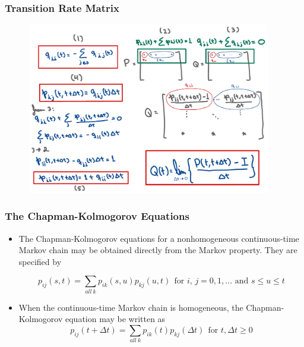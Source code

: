 \begin{frame}
    \frametitle{Transition Rate Matrix}
    \begin{figure}
        \centering
        \includegraphics[width=0.95\textwidth]{slides/figures/ctmc_qt_part_two.pdf}
    \end{figure}
\end{frame}


\begin{frame}
    \frametitle{The Chapman-Kolmogorov Equations}
        \begin{itemize}
            \item The Chapman-Kolmogorov equations for a nonhomogeneous continuous-time Markov chain may be 
            obtained directly from the Markov property. They are specified by

            \small
            $$p_{ij}(s,t) = \sum_{all~k}p_{ik}(s,u)p_{kj}(u,t)~~\text{for $i$, $j = 0,1,...$ and $s\leq u\leq t$}$$

            \item When the continuous-time Markov chain is homogeneous, the Chapman-Kolmogorov equation may be written as
            \small
            $$p_{ij}(t+\Delta t) = \sum_{all~k}p_{ik}(t)p_{kj}(\Delta t)~~\text{for $t, \Delta t\geq 0$}$$

        \end{itemize}
\end{frame}

